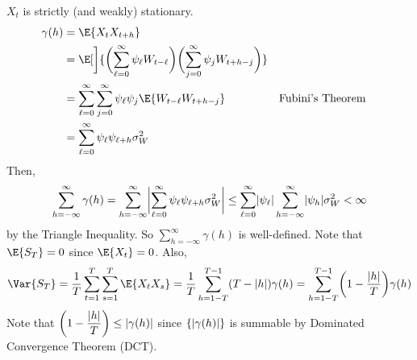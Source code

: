 \begin{Proof}{}{}
    $ X_t $ is strictly (and weakly) stationary.
    \begin{align*}
        \gamma(h)
         & =\E{X_t X_{t+h}}                                                                                                                                     \\
         & =\E[\bigg]{\biggl(\sum_{\ell=0}^{\infty} \psi_\ell W_{t-\ell}\biggr)\biggl(\sum_{j=0}^{\infty} \psi_j W_{t+h-j}\biggr)}                              \\
         & =\sum_{\ell=0}^{\infty}\sum_{j=0}^{\infty} \psi_\ell\psi_j\E{W_{t-\ell}W_{t+h-j}}                                       &  & \text{Fubini's Theorem} \\
         & = \sum_{\ell=0}^{\infty} \psi_\ell \psi_{\ell+h}\sigma_W^2
    \end{align*}
    Then,
    \[ \sum_{h=-\infty}^{\infty} \gamma(h)=\sum_{h=-\infty}^{\infty}
        \abs[\bigg]{\sum_{\ell=0}^{\infty} \psi_\ell \psi_{\ell+h}\sigma_W^2}
        \le \sum_{\ell=0}^{\infty} \abs{\psi_\ell}\sum_{h=-\infty}^{\infty} \abs{\psi_h}\sigma_W^2<\infty \]
    by the Triangle Inequality.
    So $ \sum_{h=-\infty}^{\infty} \gamma(h) $ is well-defined.
    Note that $ \E{S_T}=0 $ since $ \E{X_t}=0 $. Also,
    \[ \Var{S_T}=\frac{1}{T} \sum_{t=1}^{T} \sum_{s=1}^{T} \E{X_t X_s}=
        \frac{1}{T} \sum_{h=1-T}^{T-1} (T-\abs{h})\gamma(h)=\sum_{h=1-T}^{T-1}
        \biggl(1-\frac{\abs{h}}{T} \biggr)\gamma(h) \]
    Note that $ \displaystyle \biggl(1-\frac{\abs{h}}{T} \biggr)\le \abs{\gamma(h)} $
    since $ \set{\abs{\gamma(h)}} $ is summable by Dominated Convergence Theorem (DCT).


\end{Proof}
